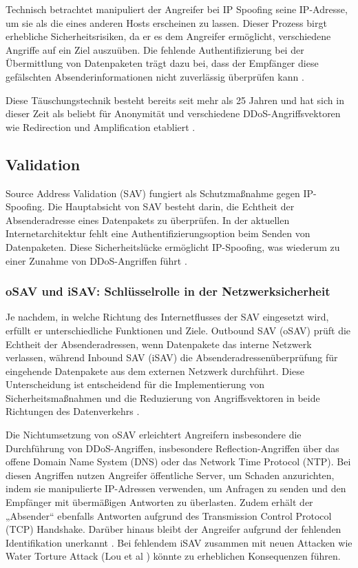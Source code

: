 \documentclass[sigplan,screen]{acmart}
\begin{document}
Technisch betrachtet manipuliert der Angreifer bei IP Spoofing seine IP-Adresse, um sie als die eines anderen Hosts erscheinen zu lassen. Dieser Prozess birgt erhebliche Sicherheitsrisiken, da er es dem Angreifer ermöglicht, verschiedene Angriffe auf ein Ziel auszuüben. Die fehlende Authentifizierung bei der Übermittlung von Datenpaketen trägt dazu bei, dass der Empfänger diese gefälschten Absenderinformationen nicht zuverlässig überprüfen kann \cite{Beverly01}.

Diese Täuschungstechnik besteht bereits seit mehr als 25 Jahren und hat sich in dieser Zeit als beliebt für Anonymität und verschiedene DDoS-Angriffsvektoren wie Redirection und Amplification etabliert \cite{manrs01}.

\subsection{Validation}
Source Address Validation (SAV) fungiert als Schutzmaßnahme gegen IP-Spoofing. Die Hauptabsicht von SAV besteht darin, die Echtheit der Absenderadresse eines Datenpakets zu überprüfen. In der aktuellen Internetarchitektur fehlt eine Authentifizierungsoption beim Senden von Datenpaketen. Diese Sicherheitslücke ermöglicht IP-Spoofing, was wiederum zu einer Zunahme von DDoS-Angriffen führt \cite{Hal01}.

\subsubsection{oSAV und iSAV: Schlüsselrolle in der Netzwerksicherheit}
Je nachdem, in welche Richtung des Internetflusses der SAV eingesetzt wird, erfüllt er unterschiedliche Funktionen und Ziele. Outbound SAV (oSAV) prüft die Echtheit der Absenderadressen, wenn Datenpakete das interne Netzwerk verlassen, während Inbound SAV (iSAV) die Absenderadressenüberprüfung für eingehende Datenpakete aus dem externen Netzwerk durchführt. Diese Unterscheidung ist entscheidend für die Implementierung von Sicherheitsmaßnahmen und die Reduzierung von Angriffsvektoren in beide Richtungen des Datenverkehrs \cite{Hal01}.

Die Nichtumsetzung von oSAV erleichtert Angreifern insbesondere die Durchführung von DDoS-Angriffen, insbesondere Reflection-Angriffen über das offene Domain Name System (DNS) oder das Network Time Protocol (NTP). Bei diesen Angriffen nutzen Angreifer öffentliche Server, um Schaden anzurichten, indem sie manipulierte IP-Adressen verwenden, um Anfragen zu senden und den Empfänger mit übermäßigen Antworten zu überlasten. Zudem erhält der „Absender“ ebenfalls Antworten aufgrund des Transmission Control Protocol (TCP) Handshake. Darüber hinaus bleibt der Angreifer aufgrund der fehlenden Identifikation unerkannt \cite{manrs01} \cite{Hal01} \cite{Ingress01}. Bei fehlendem iSAV zusammen mit neuen Attacken wie Water Torture Attack (Lou et al \cite{Lou01}) könnte zu erheblichen Konsequenzen führen.
\end{document}
